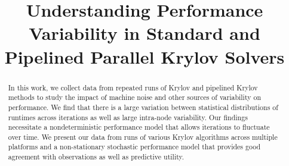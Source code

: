 \documentclass[sigconf]{acmart}
\begin{document}
%
\title{Understanding Performance Variability in Standard and Pipelined Parallel Krylov Solvers}

%
\begin{abstract}
In this work, we collect data from repeated runs of Krylov and pipelined Krylov methods 
to study the impact of machine noise and other sources of variability on performance.
We find that there is a large variation between statistical distributions of runtimes across iterations 
as well as large intra-node variability.  
Our findings necessitate a nondeterministic performance model that allows iterations to fluctuate over time.
We present our data from runs of various Krylov algorithms across multiple platforms 
and a non-stationary stochastic performance model that provides good agreement with observations as well as predictive utility. 
\end{abstract}
\end{document}
